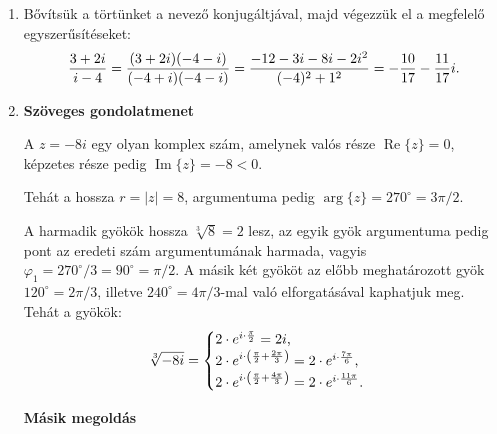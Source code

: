 \documentclass[11pt]{scrartcl}
\begin{document}
\begin{enumerate}
	\item Bővítsük a törtünket a nevező konjugáltjával, majd végezzük el a
	      megfelelő egyszerűsítéseket:
	      \[
		      \frac{3 + 2i}{i - 4}
		      = \frac{(3 + 2i)(-4 - i)}{(-4 + i)(-4 - i)}
		      = \frac{-12 - 3i - 8i - 2i^2}{(-4)^2 + 1^2}
		      = -\frac{10}{17} - \frac{11}{17} i
		      \text.
	      \]

	\item \textbf{Szöveges gondolatmenet}

	      A $z = -8i$ egy olyan komplex szám, amelynek valós része
	      $\operatorname{Re} \{z\} = 0$, képzetes része pedig
	      $\operatorname{Im} \{z\} = -8 < 0$.

	      Tehát a hossza $r = |z| = 8$, argumentuma pedig
	      $\arg \{z\} = 270^\circ = 3\pi / 2$.

	      A harmadik gyökök hossza $\sqrt[3]{8} = 2$ lesz, az egyik gyök
	      argumentuma pedig pont az eredeti szám argumentumának harmada, vagyis
	      $\varphi_1 = 270^\circ / 3 = 90^\circ = \pi / 2$. A másik két
	      gyököt az előbb meghatározott gyök $120^\circ = 2\pi/3$, illetve
	      $240^\circ = 4\pi / 3$-mal való elforgatásával kaphatjuk meg. Tehát
	      a gyökök:
	      \[
		      \sqrt[3]{-8i} = \begin{cases}
			      2 \cdot e^{i \cdot \frac{\pi}{2}}
			      = 2i
			      \text,
			      \\
			      2 \cdot e^{i \cdot \left(\frac{\pi}{2} + \frac{2\pi}{3}\right)}
			      = 2 \cdot e^{i \cdot \frac{7\pi}{6}}
			      \text,
			      \\
			      2 \cdot e^{i \cdot \left(\frac{\pi}{2} + \frac{4\pi}{3}\right)}
			      = 2 \cdot e^{i \cdot \frac{11\pi}{6}}
			      \text.
		      \end{cases}
	      \]


	      \textbf{Másik megoldás}


\end{enumerate}
\end{document}
